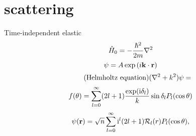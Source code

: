 
\section*{scattering}

Time-independent
elastic
\begin{equation*}
\hat{H}_0=-\frac{\hbar^2}{2m}\laplacian
\end{equation*}
\begin{equation*}
\psi=A\exp\qty(i \vb{k}\cdot \vb{r})
\end{equation*}
\begin{equation}
\tag{Helmholtz equation} (\laplacian+k^2){\psi}=
\end{equation}
\begin{displaymath}
f(\theta) = \sum_{l=0}^\infty (2 l+1) \frac{\exp( {\rm i} \delta_l)}
{k}  \sin\delta_l P_l(\cos\theta)
\end{displaymath}
\begin{displaymath}
\psi({\bf r}) = \sqrt{n}  \sum_{l=0}^\infty
{\rm i}^l  (2 l+1)   {\cal R}_l(r)  P_l(\cos\theta),
\end{displaymath}